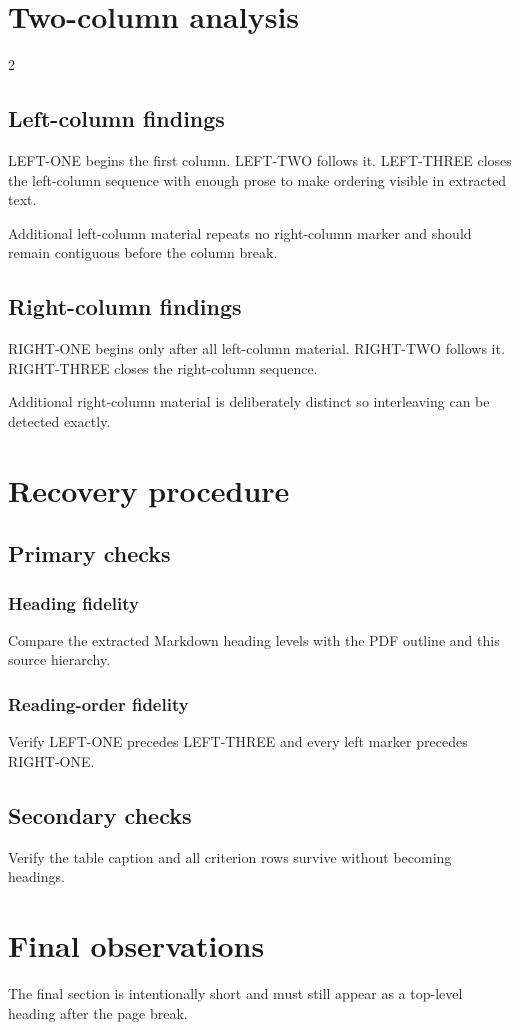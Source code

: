 \documentclass[10pt]{article}
\begin{document}
\section{Two-column analysis}
\begin{multicols}{2}
\subsection{Left-column findings}
LEFT-ONE begins the first column. LEFT-TWO follows it. LEFT-THREE closes the left-column sequence with enough prose to make ordering visible in extracted text.

Additional left-column material repeats no right-column marker and should remain contiguous before the column break.
\columnbreak
\subsection{Right-column findings}
RIGHT-ONE begins only after all left-column material. RIGHT-TWO follows it. RIGHT-THREE closes the right-column sequence.

Additional right-column material is deliberately distinct so interleaving can be detected exactly.
\end{multicols}
\newpage
\section{Recovery procedure}
\subsection{Primary checks}
\subsubsection{Heading fidelity}
Compare the extracted Markdown heading levels with the PDF outline and this source hierarchy.
\subsubsection{Reading-order fidelity}
Verify LEFT-ONE precedes LEFT-THREE and every left marker precedes RIGHT-ONE.
\subsection{Secondary checks}
Verify the table caption and all criterion rows survive without becoming headings.
\section{Final observations}
The final section is intentionally short and must still appear as a top-level heading after the page break.
\end{document}
